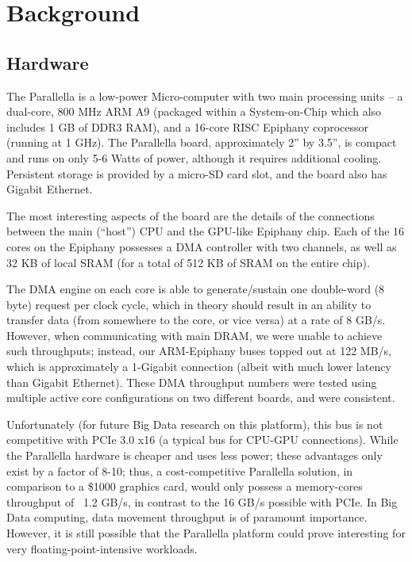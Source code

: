 \section{Background}
\label{sec:background}
\subsection{Hardware}
The Parallella is a low-power Micro-computer with two main processing units -- a dual-core, 800 MHz ARM A9 (packaged within a System-on-Chip which also includes 1 GB of DDR3 RAM), and a 16-core RISC Epiphany coprocessor (running at 1 GHz).  The Parallella board, approximately 2” by 3.5”, is compact and runs on only 5-6 Watts of power, although it requires additional cooling.  Persistent storage is provided by a micro-SD card slot, and the board also has Gigabit Ethernet.

The most interesting aspects of the board are the details of the connections between the main (“host”) CPU and the GPU-like Epiphany chip.  Each of the 16 cores on the Epiphany possesses a DMA controller with two channels, as well as 32 KB of local SRAM (for a total of 512 KB of SRAM on the entire chip).

The DMA engine on each core is able to generate/sustain one double-word (8 byte) request per clock cycle, which in theory should result in an ability to transfer data (from somewhere to the core, or vice versa) at a rate of 8 GB/s.  However, when communicating with main DRAM, we were unable to achieve such throughputs; instead, our ARM-Epiphany buses topped out at 122 MB/s, which is approximately a 1-Gigabit connection (albeit with much lower latency than Gigabit Ethernet).  These DMA throughput numbers were tested using multiple active core configurations on two different boards, and were consistent.

Unfortunately (for future Big Data research on this platform), this bus is not competitive with PCIe 3.0 x16 (a typical bus for CPU-GPU connections).  While the Parallella hardware is cheaper and uses less power; these advantages only exist by a factor of 8-10; thus, a cost-competitive Parallella solution, in comparison to a \$1000 graphics card, would only possess a memory-cores throughput of ~1.2 GB/s, in contrast to the 16 GB/s possible with PCIe.  In Big Data computing, data movement throughput is of paramount importance.  However, it is still possible that the Parallella platform could prove interesting for very floating-point-intensive workloads.
